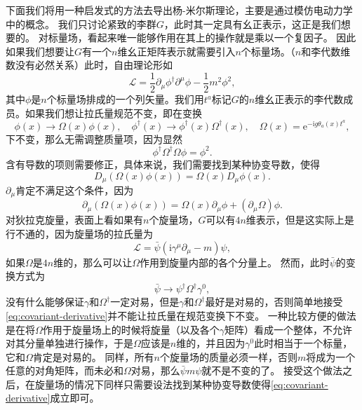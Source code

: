 \documentclass[hyperref, UTF8, a4paper]{ctexart}
\newcommand*{\ii}{\mathrm{i}}
\newcommand*{\ee}{\mathrm{e}}
\begin{document}
下面我们将用一种启发式的方法去导出杨-米尔斯理论，主要是通过模仿电动力学中的概念。
我们只讨论紧致的李群$G$，此时其一定具有幺正表示，这正是我们想要的。
对标量场，看起来唯一能够作用在其上的操作就是乘以一个复因子。
因此如果我们想要让$G$有一个$n$维幺正矩阵表示就需要引入$n$个标量场。（$n$和李代数维数没有必然关系）此时，自由理论形如
\[
    \mathcal{L} = \frac{1}{2} \partial_\mu \phi^\dagger \partial^\mu \phi - \frac{1}{2} m^2 \phi^2,
\]
其中$\phi$是$n$个标量场排成的一个列矢量。我们用$t^a$标记$G$的$n$维幺正表示的李代数成员。如果我们想让拉氏量规范不变，即在变换
\[
    \phi(x) \to \Omega(x) \phi(x), \quad \phi^\dagger(x) \to \phi^\dagger(x) \Omega^\dagger(x), \quad \Omega(x) = \ee^{- \ii g \theta_a(x) t^a},
\]
下不变，那么无需调整质量项，因为显然
\[
    \phi^\dagger \Omega^\dagger \Omega \phi = \phi^2.
\]
含有导数的项则需要修正，具体来说，我们需要找到某种协变导数，使得
\begin{equation}
    D_\mu (\Omega(x) \phi(x)) = \Omega(x) D_\mu \phi(x).
    \label{eq:covariant-derivative}
\end{equation}
$\partial_\mu$肯定不满足这个条件，因为
\[
    \partial_\mu (\Omega(x) \phi(x)) = \Omega(x) \partial_\mu \phi + (\partial_\mu \Omega) \phi.
\]
对狄拉克旋量，表面上看如果有$n$个旋量场，$G$可以有$4n$维表示，但是这实际上是行不通的，因为旋量场的拉氏量为
\[
    \mathcal{L} = \bar{\psi} (\ii \gamma^\mu \partial_\mu - m) \psi,
\]
如果$\Omega$是$4n$维的，那么可以让$\Omega$作用到旋量内部的各个分量上。
然而，此时$\bar{\psi}$的变换方式为
\[
    \bar{\psi} \to \psi^\dagger \Omega^\dagger \gamma^0,
\]
没有什么能够保证$\gamma$和$\Omega^\dagger$一定对易，但是$\gamma$和$\Omega^\dagger$最好是对易的，否则简单地接受\eqref{eq:covariant-derivative}并不能让拉氏量在规范变换下不变。
一种比较方便的做法是在将$\Omega$作用于旋量场上的时候将旋量（以及各个$\gamma$矩阵）看成一个整体，不允许对其分量单独进行操作，于是$\Omega$应该是$n$维的，并且因为$\gamma^0$此时相当于一个标量，它和$\Omega$肯定是对易的。
同样，所有$n$个旋量场的质量必须一样，否则$m$将成为一个任意的对角矩阵，而未必和$\Omega$对易，那么$\bar{\psi} m \psi$就不是不变的了。
接受这个做法之后，在旋量场的情况下同样只需要设法找到某种协变导数使得\eqref{eq:covariant-derivative}成立即可。
\end{document}
